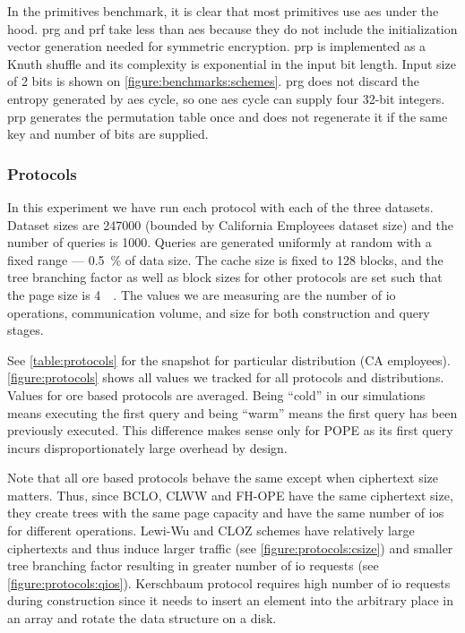 			In the primitives benchmark, it is clear that most primitives use \acrshort{aes} under the hood.
			\acrshort{prg} and \acrshort{prf} take less than \acrshort{aes} because they do not include the initialization vector generation needed for symmetric encryption.
			\acrshort{prp} is implemented as a Knuth shuffle \cite{knuth-shuffle} and its complexity is exponential in the input bit length.
			Input size of 2 bits is shown on \cref{figure:benchmarks:schemes}.
			\acrshort{prg} does not discard the entropy generated by \acrshort{aes} cycle, so one \acrshort{aes} cycle can supply four 32-bit integers.
			\acrshort{prp} generates the permutation table once and does not regenerate it if the same key and number of bits are supplied.

		\subsubsection{Protocols}\label{section:range-snapshot:results-protocols}

			In this experiment we have run each protocol with each of the three datasets.
			Dataset sizes are \num{247000} (bounded by California Employees dataset size) and the number of queries is \num{1000}.
			Queries are generated uniformly at random with a fixed range --- \SI{0.5}{\percent} of data size.
			The cache size is fixed to \num{128} blocks, and the {\BPlus} tree branching factor as well as block sizes for other protocols are set such that the page size is \SI{4}{\kibi\byte}.
			The values we are measuring are the number of \acrshort{io} operations, communication volume, and size for both construction and query stages.

			See \cref{table:protocols} for the snapshot for particular distribution (CA employees).
			\cref{figure:protocols} shows all values we tracked for all protocols and distributions.
			Values for \acrshort{ore} based protocols are averaged.
			Being ``cold'' in our simulations means executing the first query and being ``warm'' means the first query has been previously executed.
			This difference makes sense only for POPE as its first query incurs disproportionately large overhead by design.

			Note that all \acrshort{ore} based protocols behave the same except when ciphertext size matters.
			Thus, since BCLO, CLWW and FH-OPE have the same ciphertext size, they create {\BPlus} trees with the same page capacity and have the same number of \acrshort{io}s for different operations.
			Lewi-Wu and CLOZ schemes have relatively large ciphertexts and thus induce larger traffic (see \cref{figure:protocols:csize}) and smaller {\BPlus} tree branching factor resulting in greater number of \acrshort{io} requests (see \cref{figure:protocols:qios}).
			Kerschbaum protocol requires high number of \acrshort{io} requests during construction since it needs to insert an element into the arbitrary place in an array and rotate the data structure on a disk.

